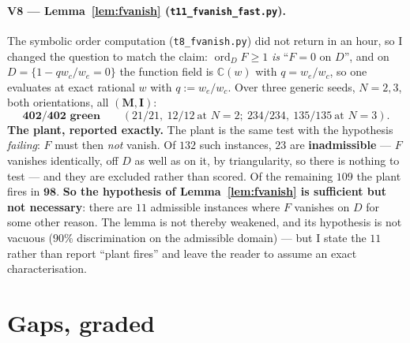 \documentclass[11pt]{article}
\theoremstyle{definition}
\newcommand{\bM}{\mathbf{M}}
\newcommand{\bI}{\mathbf{I}}
\newcommand{\ord}{\operatorname{ord}}
\begin{document}
\paragraph{V8 --- Lemma~\ref{lem:fvanish} (\texttt{t11\_fvanish\_fast.py}).}
The symbolic order computation (\texttt{t8\_fvanish.py}) did not return in an
hour, so I changed the question to match the claim: $\ord_D F\ge1$ \emph{is}
``$F=0$ on $D$'', and on $D=\{1-qw_c/w_e=0\}$ the function field is
$\mathbb{C}(w)$ with $q=w_e/w_c$, so one evaluates at exact rational $w$ with
$q:=w_e/w_c$.  Over three generic seeds, $N=2,3$, both orientations, all
$(\bM,\bI)$:
\[
  \textbf{402/402 green}\qquad
  (21/21,\ 12/12\ \text{at }N=2;\ 234/234,\ 135/135\ \text{at }N=3).
\]
\textbf{The plant, reported exactly.}  The plant is the same test with the
hypothesis \emph{failing}: $F$ must then \emph{not} vanish.  Of $132$ such
instances, $23$ are \textbf{inadmissible} --- $F$ vanishes identically, off $D$
as well as on it, by triangularity, so there is nothing to test --- and they are
excluded rather than scored.  Of the remaining $109$ the plant fires in
$\mathbf{98}$.  \textbf{So the hypothesis of Lemma~\ref{lem:fvanish} is
sufficient but not necessary}: there are $11$ admissible instances where $F$
vanishes on $D$ for some other reason.  The lemma is not thereby weakened, and
its hypothesis is not vacuous ($90\%$ discrimination on the admissible domain) ---
but I state the $11$ rather than report ``plant fires'' and leave the reader to
assume an exact characterisation.

\section{Gaps, graded}
\label{sec:gaps}
\end{document}
